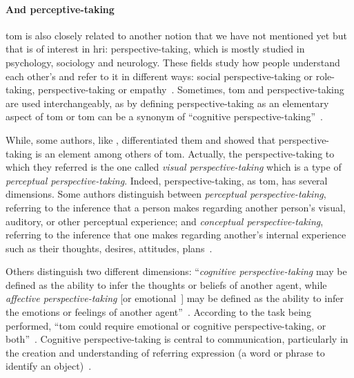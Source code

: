 \documentclass[a4paper,11pt,twoside]{StyleThese}
\begin{document}
\paragraph{And perceptive-taking} \acrshort{tom} is also closely related to another notion that we have not mentioned yet but that is of interest in \acrshort{hri}: perspective-taking, which is mostly studied in psychology, sociology and neurology. These fields study how people understand each other's and refer to it in different ways: social perspective-taking or role-taking, perspective-taking or empathy~\citep{davis_2017_self,quesque_2020_theory}. Sometimes, \acrshort{tom} and perspective-taking are used interchangeably, as by \cite{charlop_2003_using} defining perspective-taking as an elementary aspect of \acrshort{tom} or \acrshort{tom} can be a synonym of ``cognitive perspective-taking''~\citep{barnes_2004_perspective}. 

While, some authors, like \cite{westby_2014_developmental}, differentiated them and showed that perspective-taking is an element among others of \acrshort{tom}. Actually, the perspective-taking to which they referred is the one called \emph{visual perspective-taking} which is a type of \emph{perceptual perspective-taking}. Indeed, perspective-taking, as \acrshort{tom}, has several dimensions. Some authors distinguish between \emph{perceptual perspective-taking}, referring to the inference that a person makes regarding another person's visual, auditory, or other perceptual experience; and \emph{conceptual perspective-taking}, referring to the inference that one makes regarding another's internal experience such as their thoughts, desires, attitudes, plans~\citep{marvin_1976_early}. 

Others distinguish two different dimensions: ``\emph{cognitive perspective-taking} may be defined as the ability to infer the thoughts or beliefs of another agent, while \emph{affective perspective-taking} [or emotional~\citep{hynes_2006_differential}] may be defined as the ability to infer the emotions or feelings of another agent''~\citep[p.~2]{healey_2018_cognitive}. According to the task being performed, ``\acrlong{tom} could require emotional or cognitive perspective-taking, or both''~\citep[p.~375]{hynes_2006_differential}. Cognitive perspective-taking is central to communication, particularly in the creation and understanding of referring expression (\ie a word or phrase to identify an object)~\citep{krauss_1991_perspective}.

\bigskip
\end{document}
